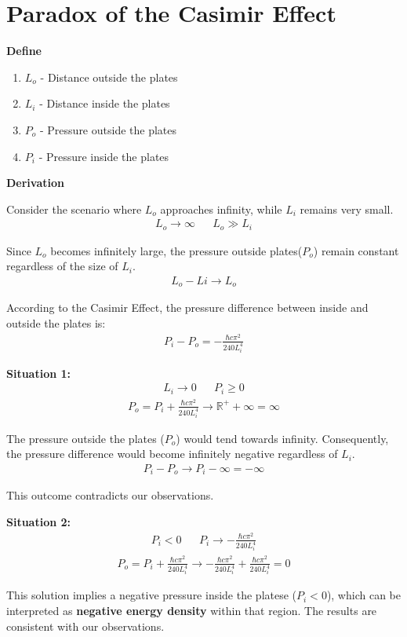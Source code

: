 \section{Paradox of the Casimir Effect}

\noindent\textbf{Define}
\begin{enumerate}
    \item \(L_o\) - Distance outside the plates
    \item \(L_i\) - Distance inside the plates
    \item \(P_o\) - Pressure outside the plates
    \item \(P_i\) - Pressure inside the plates
\end{enumerate}

\noindent\textbf{Derivation}


Consider the scenario where  $L_o$ approaches infinity, while $L_i$ remains very small.
\begin{align}
    L_o \rightarrow \infty && L_o \gg L_i
\end{align}

Since $L_o$ becomes infinitely large, the pressure outside plates($P_o$) remain constant regardless of the size of $L_i$.
\begin{align}L_o - Li \rightarrow L_o\end{align}

According to the Casimir Effect\citep*{Casimir:1948dh}, the pressure difference between inside and outside the plates is:
\begin{align}P_i - P_o = -\frac{\hbar c \pi^2}{240 L_i^4}\end{align}


\noindent\textbf{Situation 1:}
\begin{align}
    &L_i \rightarrow 0 && P_i \ge 0&
\end{align}
\begin{align}
    P_o = P_i + \frac{\hbar c \pi^2}{240 L_i^4} \rightarrow {\mathbb{R}}^+ + \infty = \infty
\end{align}

The pressure outside the plates ($P_o$) would tend towards infinity.
Consequently, the pressure difference would become infinitely negative regardless of $L_i$.
\begin{align}P_i - P_o \rightarrow P_i - \infty = - \infty\end{align}

This outcome contradicts our observations.


\noindent\textbf{Situation 2:}
\begin{align}
    P_i < 0 && P_i \rightarrow -\frac{\hbar c \pi^2}{240 L_i^4}
\end{align}
\begin{align}
    P_o = P_i + \frac{\hbar c \pi^2}{240 L_i^4} \rightarrow -\frac{\hbar c \pi^2}{240 L_i^4} + \frac{\hbar c \pi^2}{240 L_i^4} = 0
\end{align}

This solution implies a negative pressure inside the platese ($P_i < 0$), which can be interpreted as \textbf{negative energy density} within that region.
The results are consistent with our observations.